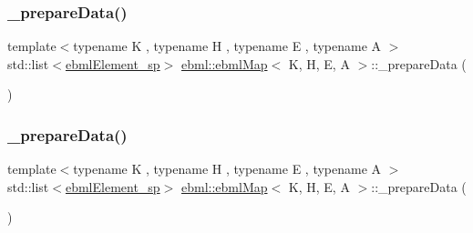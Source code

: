 \mbox{\label{classebml_1_1ebmlMap_a52dfd52eeeb589a90de98b7aad3beeef}} 
\subsubsection{\texorpdfstring{\+\_\+prepare\+Data()}{\_prepareData()}\hspace{0.1cm}{\footnotesize\ttfamily [2/6]}}
{\footnotesize\ttfamily template$<$typename K , typename H , typename E , typename A $>$ \\
std\+::list$<$\mbox{\hyperlink{namespaceebml_adad533b7705a16bb360fe56380c5e7be}{ebml\+Element\+\_\+sp}}$>$ \mbox{\hyperlink{classebml_1_1ebmlMap}{ebml\+::ebml\+Map}}$<$ K, H, E, A $>$\+::\+\_\+prepare\+Data (\begin{DoxyParamCaption}\item[{const std\+::list$<$ std\+::pair$<$ K, \mbox{\hyperlink{namespaceebml_adad533b7705a16bb360fe56380c5e7be}{ebml\+Element\+\_\+sp}} $>$$>$ \&}]{ }\end{DoxyParamCaption})\hspace{0.3cm}{\ttfamily [protected]}}

\mbox{\label{classebml_1_1ebmlMap_ad9cbd0499431f6dbe19bcc022624d61f}} 
\subsubsection{\texorpdfstring{\+\_\+prepare\+Data()}{\_prepareData()}\hspace{0.1cm}{\footnotesize\ttfamily [3/6]}}
{\footnotesize\ttfamily template$<$typename K , typename H , typename E , typename A $>$ \\
std\+::list$<$\mbox{\hyperlink{namespaceebml_adad533b7705a16bb360fe56380c5e7be}{ebml\+Element\+\_\+sp}}$>$ \mbox{\hyperlink{classebml_1_1ebmlMap}{ebml\+::ebml\+Map}}$<$ K, H, E, A $>$\+::\+\_\+prepare\+Data (\begin{DoxyParamCaption}\item[{std\+::list$<$ std\+::pair$<$ \mbox{\hyperlink{namespaceebml_adad533b7705a16bb360fe56380c5e7be}{ebml\+Element\+\_\+sp}}, \mbox{\hyperlink{namespaceebml_adad533b7705a16bb360fe56380c5e7be}{ebml\+Element\+\_\+sp}} $>$$>$ \&\&}]{ }\end{DoxyParamCaption})\hspace{0.3cm}{\ttfamily [protected]}}

